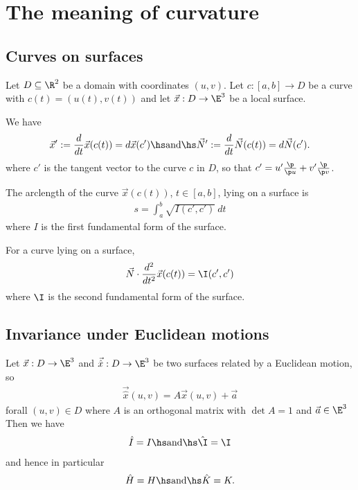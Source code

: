 \documentclass{article}
\begin{document}
\section{The meaning of curvature}

\subsection{Curves on surfaces}

Let $D\subseteq\R^2$ be a domain with coordinates $(u,v)$.
Let $c:[a,b]\to D$ be a curve with $c(t)=(u(t),v(t))$ and let $\vec x: D\to\E^3$ be a
local surface.

\begin{lemma}[Notes 9.1]
	We have
	\begin{align*}
		\vec x' := \frac{d}{dt}\vec x(c(t)) = d\vec x(c')\hs\text{and}\hs
		\vec N' := \frac{d}{dt}\vec N(c(t)) = d\vec N(c').
	\end{align*}
	where $c'$ is the tangent vector to the curve $c$ in $D$, so that
	$c'=u'\frac{\p }{\p u}+v'\frac{\p }{\p v}$.
\end{lemma}

\begin{proposition}[Notes 9.2]
	The arclength of the curve $\vec x(c(t))$, $t\in[a,b]$, lying on a surface is
	\begin{align*}
		s = \int_a^b \sqrt{I(c',c')}\:dt
	\end{align*}
	where $I$ is the first fundamental form of the surface.
\end{proposition}

\begin{proposition}[Notes 9.5]
	For a curve lying on a surface,
	\begin{align*}
		\vec N\cdot \frac{d^2}{dt^2}\vec x(c(t)) = \I(c',c')
	\end{align*}
	where $\I$ is the second fundamental form of the surface.
\end{proposition}

\subsection{Invariance under Euclidean motions}

\begin{theorem}[Notes 9.7]
	Let $\vec x: D\to\E^3$ and $\vec{\hat x}:D\to\E^3$ be two surfaces related by a
	Euclidean motion, so
	\begin{align*}
		\vec{\hat x} (u,v) = A\vec x(u,v)+\vec a
	\end{align*}
	forall $(u,v)\in D$ where $A$ is an orthogonal matrix with $\det A=1$ and $\vec a\in\E^3$
	Then we have
	\begin{align*}
		\hat I = I \hs \text{and} \hs \hat\I = \I
	\end{align*}
	and hence in particular
	\begin{align*}
		\hat H = H \hs \text{and} \hs \hat K = K.
	\end{align*}
\end{theorem}
\end{document}
